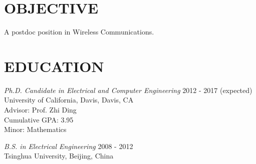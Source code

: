 \documentclass[margin]{res} %
\begin{document}
    \begin{resume}

     
        \section{OBJECTIVE}  
        A postdoc position in Wireless Communications.
    
    
        \section{EDUCATION}
    
        {\sl Ph.D. Candidate in Electrical and Computer Engineering} \hfill 2012 -
        2017 (expected) \\
        University of California, Davis, Davis, CA \\
        Advisor: Prof. Zhi Ding \\
        Cumulative GPA: 3.95 \\
        Minor: Mathematics 
        
        {\sl B.S. in Electrical Engineering}  \hfill 2008 - 2012\\
        Tsinghua University, Beijing, China
       
    
    

\end{resume}
\end{document}
